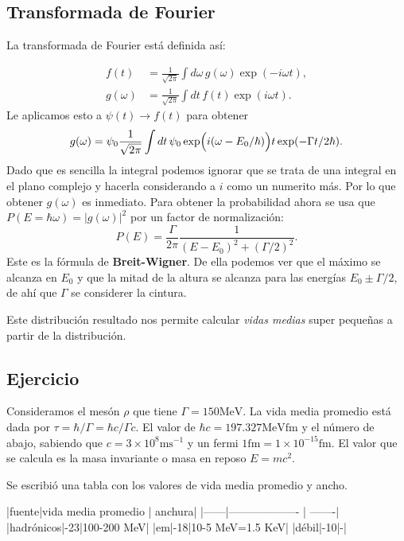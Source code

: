 \subsection{Transformada de Fourier}

La transformada de Fourier está definida así:

\begin{align*}
  f(t) &= \frac{1}{\sqrt{2\pi}} \int d\omega \, g(\omega)
  \exp(-i\omega t),\\
  g(\omega) &= \frac{1}{\sqrt{2\pi}} \int dt \, f(t)
  \exp(i\omega t).
\end{align*}
Le aplicamos esto a $\psi(t) \to f(t)$ para obtener
\[g(\omega) = \psi_0 \frac{1}{\sqrt{2\pi}} \int dt\,\psi_0
\exp\Bigl(i(\omega - E_0/\hbar)\Bigr)t \exp(-\Gamma
t/2\hbar).
\]
Dado que es sencilla la integral podemos ignorar que se
trata de una integral en el plano complejo y hacerla
considerando a $i$ como un numerito más. Por lo que obtener
$g(\omega)$ es inmediato. Para obtener la probabilidad ahora
se usa que $P(E=\hbar\omega) = \vert g(\omega)\vert^2$ por
un factor de normalización:
\[P(E) = \frac{\Gamma}{2\pi}\frac{1}{(E-E_0)^2 +
(\Gamma/2)^2}.\] Este es la fórmula de
\textbf{Breit-Wigner}. De ella podemos ver que el máximo se
alcanza en $E_0$ y que la mitad de la altura se alcanza para
las energías $E_0 \pm \Gamma/2$, de ahí que $\Gamma$ se
considerer la cintura.

Este distribución resultado nos permite calcular \emph{vidas
medias} super pequeñas a partir de la distribución. %

\subsection{Ejercicio}
Consideramos el mesón $\rho$ que tiene $\Gamma = 150
\mathrm{MeV}$. La vida media promedio está dada por $\tau =
\hbar/\Gamma = \hbar c / \Gamma c$. El valor de $\hbar c =
197.327 \mathrm{MeV fm}$ y el número de abajo, sabiendo que
$c = 3\times10^{8} \mathrm{ms}^{-1}$ y un fermi $1
\mathrm{fm} = 1\times10^{-15}\mathrm{fm}$. El valor que se
calcula es la masa invariante o masa en reposo $E = mc^2$.

Se escribió una tabla con los valores de vida media promedio
y ancho.

|fuente|vida media promedio | anchura|
|------|------------------- | -------|
|hadrónicos|-23|100-200 MeV|
|em|-18|10-5 MeV=1.5 KeV|
|débil|-10|-|
